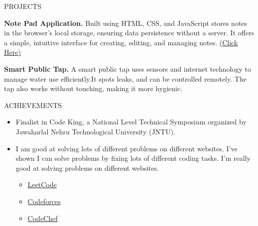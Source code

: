 \documentclass{resume} %
\begin{document}
\begin{rSection}{PROJECTS}
\vspace{-1.25em}
\item \textbf{Note Pad Application. }Built using HTML, CSS, and JavaScript stores notes in the browser's local storage, ensuring data persistence without a server. It offers a simple, intuitive interface for creating, editing, and managing notes.  { \href{https://gnanadeep1.github.io/Note-Site/}{(Click Here)}}
\item \textbf{Smart Public Tap. } {A smart public tap uses sensors and internet technology to manage water use efficiently.It spots leaks, and can be controlled remotely. The tap also works without touching, making it more hygienic.}

\end{rSection} 

\begin{rSection}{ACHIEVEMENTS} 
 \begin{itemize}
     \item Finalist in Code King, a National Level Technical Symposium organized by Jawaharlal Nehru Technological
University (JNTU).
    \item  I am good at solving lots of different problems on different websites. I've shown I can solve problems by fixing lots of different coding tasks. I'm really good at solving problems on different websites.
    \begin{itemize}
        \item \textbf{}{ \href{https://leetcode.com/u/21h51a6694/}{LeetCode}}
 \item \textbf{}{ \href{https://codeforces.com/profile/gnanadeepchowdhary}{Codeforces}}
 \item \textbf{}{ \href{https://www.codechef.com/users/gdgdd_123455#=}{CodeChef}}
 \end{itemize}{}
    \end{itemize}





\end{rSection}
\end{document}
